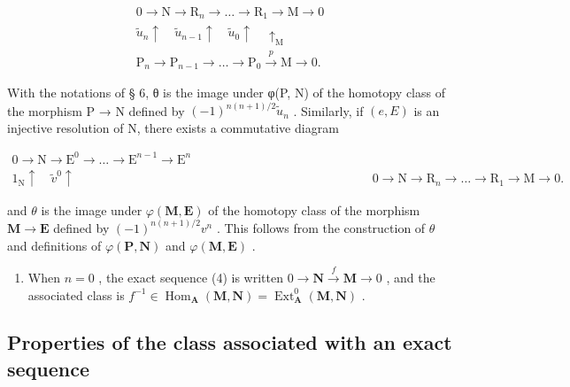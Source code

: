 \[
\begin{array}{c} 0 \longrightarrow \mathrm{N} \longrightarrow \mathrm{R} _ {n} \longrightarrow \dots \longrightarrow \mathrm{R} _ {1} \longrightarrow \mathrm{M} \longrightarrow 0 \\ \tilde {u} _ {n} \uparrow \quad \tilde {u} _ {n - 1} \uparrow \quad \tilde {u} _ {0} \uparrow \quad \uparrow_ {\mathrm{M}} \\ \mathrm{P} _ {n} \longrightarrow \mathrm{P} _ {n - 1} \longrightarrow \dots \longrightarrow \mathrm{P} _ {0} \xrightarrow {p} \mathrm{M} \longrightarrow 0. \end{array}
\]

With the notations of § 6, θ is the image under φ(P, N) of the homotopy class of the morphism P → N defined by \((-1)^{n(n+1)/2} \tilde{u}_{n}\) . Similarly, if \((e, E)\) is an injective resolution of N, there exists a commutative diagram

\[
\begin{array}{c} 0 \longrightarrow \mathrm{N} \longrightarrow \mathrm{E} ^ {0} \longrightarrow \dots \longrightarrow \mathrm{E} ^ {n - 1} \longrightarrow \mathrm{E} ^ {n} \\ 1 _ {\mathrm{N}} \uparrow \quad \tilde {v} ^ {0} \uparrow \quad \quad \quad \quad \quad \quad \quad \quad \quad \quad \quad \quad \quad \quad \quad \quad \quad \quad \quad \quad \quad \quad \quad \quad 0 \longrightarrow \mathrm{N} \longrightarrow \mathrm{R} _ {n} \longrightarrow \dots \longrightarrow \mathrm{R} _ {1} \longrightarrow \mathrm{M} \longrightarrow 0. \end{array}
\]

and \(\theta\) is the image under \(\varphi(\mathbf{M},\mathbf{E})\) of the homotopy class of the morphism \(\mathbf{M}\to\mathbf{E}\) defined by \((-1)^{n(n+1)/2}v^{n}\) . This follows from the construction of \(\theta\) and definitions of \(\varphi(\mathbf{P},\mathbf{N})\) and \(\varphi(\mathbf{M},\mathbf{E})\) .

\begin{enumerate}
\def\labelenumi{\arabic{enumi})}
\setcounter{enumi}{1}
\tightlist
\item
  When \(n = 0\) , the exact sequence (4) is written \(0 \to \mathbf{N} \xrightarrow{f} \mathbf{M} \to 0\) , and the associated class is \(f^{-1} \in \operatorname{Hom}_{\mathbf{A}}(\mathbf{M}, \mathbf{N}) = \operatorname{Ext}_{\mathbf{A}}^{0}(\mathbf{M}, \mathbf{N})\) .
\end{enumerate}

\subsection{Properties of the class associated with an exact sequence}

